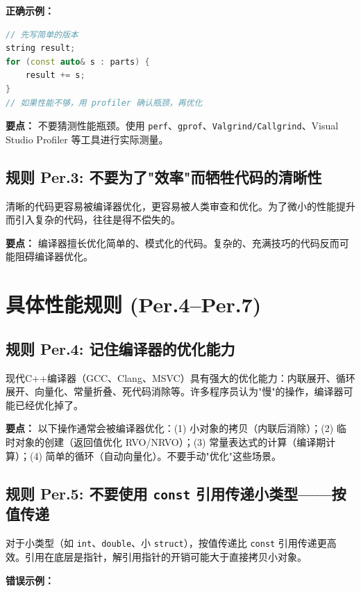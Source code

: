 \textbf{正确示例：}

\begin{lstlisting}[language=C++]
// 先写简单的版本
string result;
for (const auto& s : parts) {
    result += s;
}
// 如果性能不够，用 profiler 确认瓶颈，再优化
\end{lstlisting}

\textbf{要点：} 不要猜测性能瓶颈。使用 \texttt{perf}、\texttt{gprof}、\texttt{Valgrind/Callgrind}、Visual Studio Profiler 等工具进行实际测量。

\subsection*{\textbf{规则 Per.3:} 不要为了"效率"而牺牲代码的清晰性}

清晰的代码更容易被编译器优化，更容易被人类审查和优化。为了微小的性能提升而引入复杂的代码，往往是得不偿失的。

\textbf{要点：} 编译器擅长优化简单的、模式化的代码。复杂的、充满技巧的代码反而可能阻碍编译器优化。

\section{具体性能规则 (Per.4--Per.7)}

\subsection*{\textbf{规则 Per.4:} 记住编译器的优化能力}

现代C++编译器（GCC、Clang、MSVC）具有强大的优化能力：内联展开、循环展开、向量化、常量折叠、死代码消除等。许多程序员认为"慢"的操作，编译器可能已经优化掉了。

\textbf{要点：} 以下操作通常会被编译器优化：(1) 小对象的拷贝（内联后消除）；(2) 临时对象的创建（返回值优化 RVO/NRVO）；(3) 常量表达式的计算（编译期计算）；(4) 简单的循环（自动向量化）。不要手动"优化"这些场景。

\subsection*{\textbf{规则 Per.5:} 不要使用 \texttt{const} 引用传递小类型——按值传递}

对于小类型（如 \texttt{int}、\texttt{double}、小 \texttt{struct}），按值传递比 \texttt{const} 引用传递更高效。引用在底层是指针，解引用指针的开销可能大于直接拷贝小对象。

\textbf{错误示例：}

